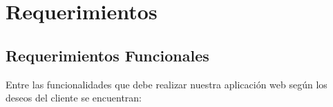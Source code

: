 %
%
%
%
\section{Requerimientos}

\subsection{Requerimientos Funcionales}

Entre las funcionalidades que debe realizar nuestra aplicación web según los deseos del cliente se encuentran:

